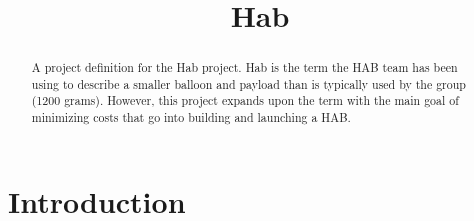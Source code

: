 \documentclass[conference]{IEEEtran} %
\title{\textmu{}Hab}
\author{
  \IEEEauthorblockN{%
    Austin~Bodzas\IEEEauthorrefmark{1}
  }
  \IEEEauthorblockA{%
    RIT Space Exploration, Rochester Institute of Technology \\ %
    Rochester, N.Y. \\
    Email:
    \IEEEauthorrefmark{1}abb6499@rit.edu
  }
}
\begin{document}
\maketitle%

\begin{abstract}

    A project definition for the \textmu{}Hab project.  \textmu{}Hab is the term the
    HAB team has been using to describe a smaller balloon and payload than is
    typically used by the group (1200 grams). However, this project expands upon
    the term with the main goal of minimizing costs that go into building and
    launching a HAB.\@
\end{abstract}
\label{sec:nomenclature}
\newcommand{\nomunit}[1]{%
\renewcommand{\nomentryend}{\hspace*{\fill}#1}}
\renewcommand{\nompreamble}{}
\printnomenclature{}



\section{Introduction}
\label{sec:introduction}
\end{document}
